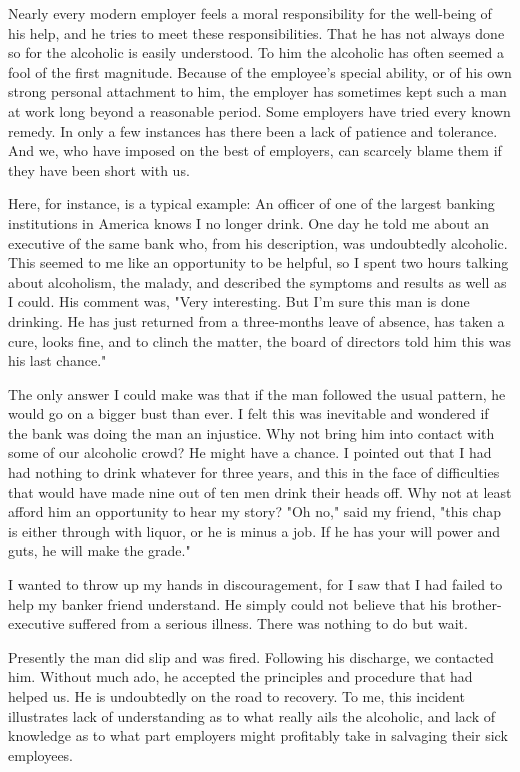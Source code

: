 \begin{biblechapter}
Nearly every modern employer feels a moral responsibility for the well-being of his help, and he tries to meet these responsibilities.  That he has not always done so for the alcoholic is easily understood.  To him the alcoholic has often seemed a fool of the first magnitude.  Because of the employee's special ability, or of his own strong personal attachment to him, the employer has sometimes kept such a man at work long beyond a reasonable period.  Some employers have tried every known remedy.  In only a few instances has there been a lack of patience and tolerance.  And we, who have imposed on the best of employers, can scarcely blame them if they have been short with us.

Here, for instance, is a typical example:  An officer of one of the largest banking institutions in America knows I no longer drink.  One day he told me about an executive of the same bank who, from his description, was undoubtedly alcoholic.  This seemed to me like an opportunity to be helpful, so I spent two hours talking about alcoholism, the malady, and described the symptoms and results as well as I could.  His comment was, "Very interesting.  But I'm sure this man is done drinking.  He has just returned from a three-months leave of absence, has taken a cure, looks fine, and to clinch the matter, the board of directors told him this was his last chance."

The only answer I could make was that if the man followed the usual pattern, he would go on a bigger bust than ever.  I felt this was inevitable and wondered if the bank was doing the man an injustice.  Why not bring him into contact with some of our alcoholic crowd?  He might have a chance.  I pointed out that I had had nothing to drink whatever for three years, and this in the face of difficulties that would have made nine out of ten men drink their heads off.  Why not at least afford him an opportunity to hear my story?  "Oh no," said my friend, "this chap is either through with liquor, or he is minus a job.  If he has your will power and guts, he will make the grade."

I wanted to throw up my hands in discouragement, for I saw that I had failed to help my banker friend understand.  He simply could not believe that his brother-executive suffered from a serious illness.  There was nothing to do but wait.

Presently the man did slip and was fired.  Following his discharge, we contacted him.  Without much ado, he accepted the principles and procedure that had helped us.  He is undoubtedly on the road to recovery.  To me, this incident illustrates lack of understanding as to what really ails the alcoholic, and lack of knowledge as to what part employers might profitably take in salvaging their sick employees.


\end{biblechapter}
